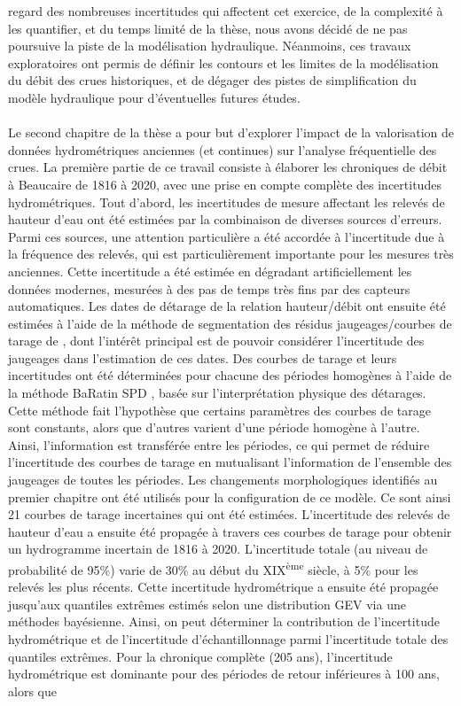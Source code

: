 regard des nombreuses incertitudes qui affectent cet exercice, de la complexité à les quantifier, et du temps limité de la thèse, nous avons décidé de ne pas poursuive la piste de la modélisation hydraulique. Néanmoins, ces travaux exploratoires ont permis de définir les contours et les limites de la modélisation du débit des crues historiques, et de dégager des pistes de simplification du modèle hydraulique pour d'éventuelles futures études.
	
	\paragraph{} Le second chapitre de la thèse a pour but d'explorer l'impact de la valorisation de données hydrométriques anciennes (et continues) sur l'analyse fréquentielle des crues. La première partie de ce travail consiste à élaborer les chroniques de débit à Beaucaire de 1816 à 2020, avec une prise en compte complète des incertitudes hydrométriques. Tout d'abord, les incertitudes de mesure affectant les relevés de hauteur d'eau ont été estimées par la combinaison de diverses sources d'erreurs. Parmi ces sources, une attention particulière a été accordée à l'incertitude due à la fréquence des relevés, qui est particulièrement importante pour les mesures très anciennes. Cette incertitude a été estimée en dégradant artificiellement les données modernes, mesurées à des pas de temps très fins par des capteurs automatiques. Les dates de détarage de la relation hauteur/débit ont ensuite été estimées à l'aide de la méthode de segmentation des résidus jaugeages/courbes de tarage de \citet{darienzo_detection_2021}, dont l'intérêt principal est de pouvoir considérer l'incertitude des jaugeages dans l'estimation de ces dates. Des courbes de tarage et leurs incertitudes ont été déterminées pour chacune des périodes homogènes à l'aide de la méthode BaRatin SPD \citep{mansanarez_shift_2019}, basée sur l'interprétation physique des détarages. Cette méthode fait l'hypothèse que certains paramètres des courbes de tarage sont constants, alors que d'autres varient d'une période homogène à l'autre. Ainsi, l'information est transférée entre les périodes, ce qui permet de réduire l'incertitude des courbes de tarage en mutualisant l'information de l'ensemble des jaugeages de toutes les périodes. Les changements morphologiques identifiés au premier chapitre ont été utilisés pour la configuration de ce modèle. Ce sont ainsi 21 courbes de tarage incertaines qui ont été estimées. L'incertitude des relevés de hauteur d'eau a ensuite été propagée à travers ces courbes de tarage pour obtenir un hydrogramme incertain de 1816 à 2020. L'incertitude totale (au niveau de probabilité de 95\%) varie de 30\% au début du XIX\textsuperscript{ème} siècle, à 5\% pour les relevés les plus récents. Cette incertitude hydrométrique a ensuite été propagée jusqu'aux quantiles extrêmes estimés selon une distribution GEV via une méthodes bayésienne. Ainsi, on peut déterminer la contribution de l'incertitude hydrométrique et de l'incertitude d'échantillonnage parmi l'incertitude totale des quantiles extrêmes. Pour la chronique complète (205 ans), l'incertitude hydrométrique est dominante pour des périodes de retour inférieures à 100 ans, alors que 
